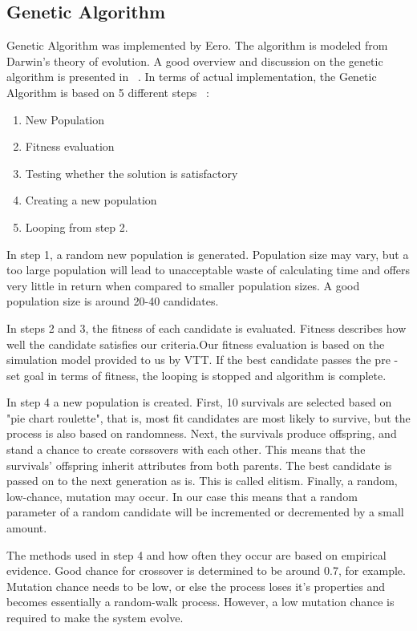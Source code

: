 \documentclass[twoside]{article}
\begin{document}
\begin{multicols}{2}
\section{Genetic Algorithm}

	Genetic Algorithm was implemented by Eero. The algorithm is modeled from Darwin’s theory of evolution. A good overview and discussion on the genetic algorithm is presented in ~\cite{mitchell}. In terms of actual implementation, the Genetic Algorithm is based on 5 different steps ~\cite{obitko}:
	\begin{enumerate} \itemsep1pt \parskip0pt 
	\item New Population
	\item Fitness evaluation
	\item Testing whether the solution is satisfactory
	\item Creating a new population
	\item Looping from step 2.
	\end{enumerate}
 	
	In step 1, a random new population is generated.  Population size may vary, but a too large population will lead to unacceptable waste of calculating time and offers very little in return when compared to smaller population sizes. A good population size is around 20-40 candidates.


	In steps 2 and 3, the fitness of each candidate is evaluated.  Fitness describes how well the candidate satisfies our criteria.Our fitness evaluation is based on the simulation model provided to us by VTT.  If the best candidate passes the pre -set goal in terms of  fitness, the  looping is stopped and algorithm is complete.
	
	In step 4 a new population is created. First, 10 survivals are  selected based on "pie chart roulette", that is, most fit candidates are most likely to survive, but the process is also based on randomness. Next, the survivals produce offspring, and stand a chance to create corssovers with each other. This means that the survivals' offspring inherit attributes from both parents. The best candidate is passed on to the next generation as is. This is called elitism. Finally, a  random, low-chance, mutation may occur. In our case this means that a random parameter  of a random  candidate will be incremented or decremented by a small amount.
	
	The methods used in step 4 and how often they occur are based on empirical evidence. Good  chance for crossover is determined to be around 0.7, for example. Mutation chance needs to be low, or else the process loses it's properties and becomes essentially a random-walk process. However, a low mutation chance is required to make the system evolve.
	

\end{multicols}
\end{document}
